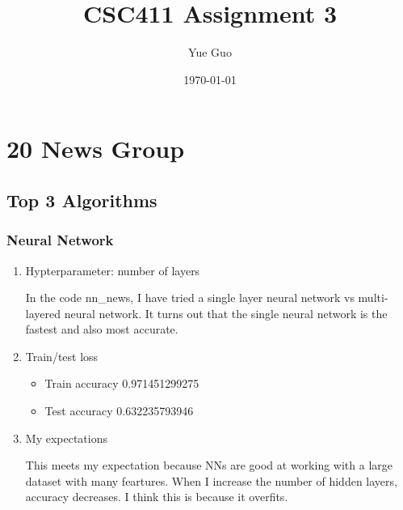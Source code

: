 \documentclass[letterpaper, 12]{article}
\date{\today}
\title{CSC411 Assignment 3}
\author{Yue Guo}
\begin{document}
\maketitle

\section{20 News Group}
\subsection{Top 3 Algorithms}
\subsubsection{Neural Network}
\begin{enumerate}

    \item Hypterparameter: number of layers
	
	In the code nn\_news, I have tried a single layer neural network vs multi-layered neural network.  It turns out that the single neural network is the fastest and also most accurate.

	\item Train/test loss
	\begin{itemize}
     \item  Train accuracy 0.971451299275
     \item Test accuracy 0.632235793946
        \end{itemize}
      \item My expectations
      
      This meets my expectation because NNs are good at working with a large dataset with many feartures. When I increase the number of hidden layers, accuracy decreases. I think this is because it overfits.
  
\end{enumerate}
\end{document}
